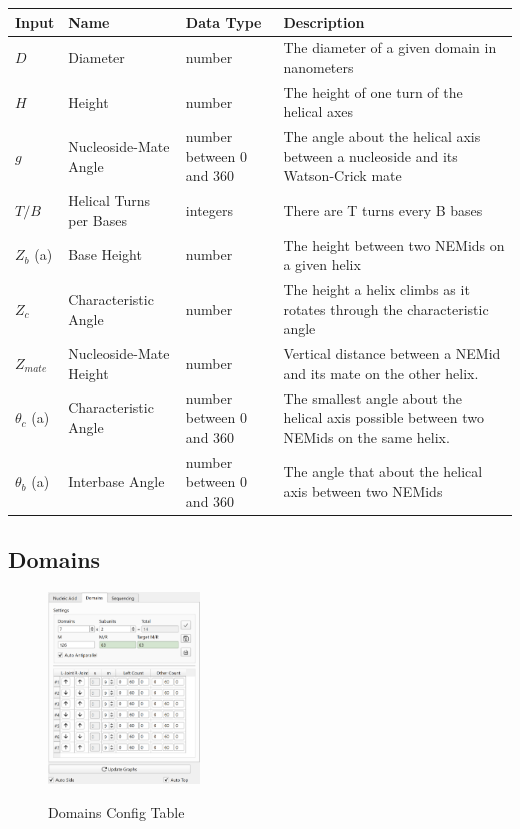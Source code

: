 \documentclass[titlepage]{article}
\begin{document}
	\begin{tabular}{|p{.5in}|p{1in}|p{.7in}|p{1.5in}|}
		\label{tab:setting-descriptions}
		\centering
		Input & Name & Data Type & Description \\
		\hline
		$D$ & Diameter & number & The diameter of a given domain in nanometers \\ \hline
		$H$ & Height & number & The height of one turn of the helical axes \\ \hline
		$g$ & Nucleoside-Mate Angle & number between 0 and 360 & The angle about the helical axis between a nucleoside and its Watson-Crick mate \\ \hline
		$T/B$ & Helical Turns per Bases & integers & There are T turns every B bases \\ \hline
		$Z_b$ (a) & Base Height & number & The height between two NEMids on a given helix \\ \hline
		$Z_c$ & Characteristic Angle & number & The height a helix climbs as it rotates through the characteristic angle \\ \hline
		$Z_{mate}$ & Nucleoside-Mate Height & number & Vertical distance between a NEMid and its mate on the other helix. \\ \hline
		$\theta_{c}$ (a) & Characteristic Angle & number between 0 and 360 & The smallest angle about the helical axis possible between two NEMids on the same helix. \\ \hline
		$\theta_{b}$ (a) & Interbase Angle & number between 0 and 360 & The angle that about the helical axis between two NEMids \\
	\end{tabular}
	
	\subsection{Domains}
	
	\begin{figure}
		\centering
		\caption{Domains Config Table}
		\includegraphics[height=2in]{domain-config-table.png}
		\label{fig:domain-config-table}
	\end{figure}
\end{document}
